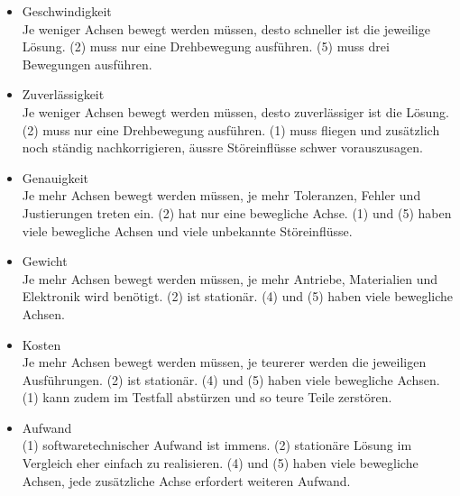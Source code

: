 			\begin{itemize}
				\item Geschwindigkeit\\
				Je weniger Achsen bewegt werden müssen, desto schneller ist die jeweilige Lösung. (2) muss nur eine Drehbewegung ausführen. (5) muss drei Bewegungen ausführen.
				\item Zuverlässigkeit\\
				Je weniger Achsen bewegt werden müssen, desto zuverlässiger ist die Lösung. (2) muss nur eine Drehbewegung ausführen. (1) muss fliegen und zusätzlich noch ständig nachkorrigieren, äussre Störeinflüsse schwer vorauszusagen.
				\item Genauigkeit\\
				Je mehr Achsen bewegt werden müssen, je mehr Toleranzen, Fehler und Justierungen treten ein. (2) hat nur eine bewegliche Achse. (1) und (5) haben viele bewegliche Achsen und viele unbekannte Störeinflüsse.
				\item Gewicht\\
				Je mehr Achsen bewegt werden müssen, je mehr Antriebe, Materialien und Elektronik wird benötigt. (2) ist stationär. (4) und (5) haben viele bewegliche Achsen. 
				\item Kosten\\
				Je mehr Achsen bewegt werden müssen, je teurerer werden die jeweiligen Ausführungen. (2) ist stationär. (4) und (5) haben viele bewegliche Achsen. (1) kann zudem im Testfall abstürzen und so teure Teile zerstören.
				\item Aufwand\\
				(1) softwaretechnischer Aufwand ist immens. (2) stationäre Lösung im Vergleich eher einfach zu realisieren. (4) und (5) haben viele bewegliche Achsen, jede zusätzliche Achse erfordert weiteren Aufwand.	
			\end{itemize}

